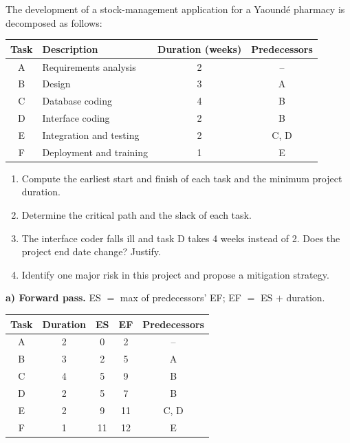 \documentclass[11pt]{article}
\begin{document}
\begin{exoresolu}
The development of a stock-management application for a Yaoundé pharmacy is decomposed as follows:

\begin{center}
\begin{tabular}{|c|l|c|c|}
\hline
\rowcolor{popblueL} Task & Description & Duration (weeks) & Predecessors \\
\hline
A & Requirements analysis & 2 & -- \\
B & Design & 3 & A \\
C & Database coding & 4 & B \\
D & Interface coding & 2 & B \\
E & Integration and testing & 2 & C, D \\
F & Deployment and training & 1 & E \\
\hline
\end{tabular}
\end{center}

\begin{enumerate}
\item[a)] Compute the earliest start and finish of each task and the minimum project duration.
\item[b)] Determine the critical path and the slack of each task.
\item[c)] The interface coder falls ill and task D takes 4 weeks instead of 2. Does the project end date change? Justify.
\item[d)] Identify one major risk in this project and propose a mitigation strategy.
\end{enumerate}
\tcblower
\textbf{a) Forward pass.} ES $=$ max of predecessors' EF; EF $=$ ES $+$ duration.

\begin{center}
\begin{tabular}{|c|c|c|c|c|}
\hline
\rowcolor{popblueL} Task & Duration & ES & EF & Predecessors \\
\hline
A & 2 & 0 & 2 & -- \\
B & 3 & 2 & 5 & A \\
C & 4 & 5 & 9 & B \\
D & 2 & 5 & 7 & B \\
E & 2 & 9 & 11 & C, D \\
F & 1 & 11 & 12 & E \\
\hline
\end{tabular}
\end{center}


\end{exoresolu}
\end{document}
